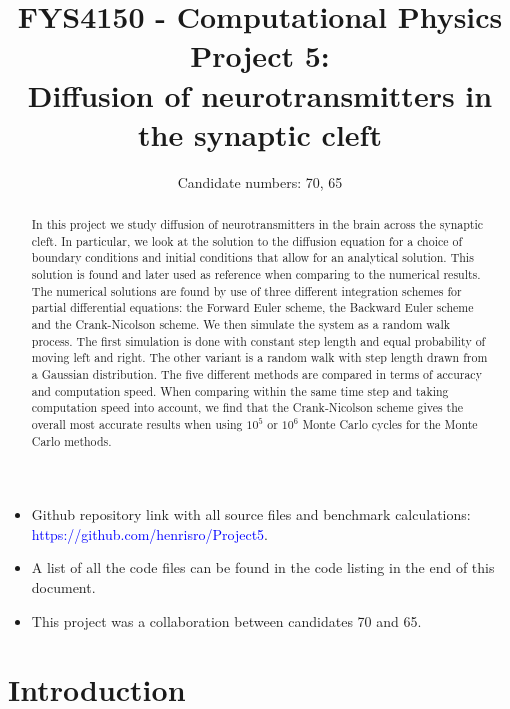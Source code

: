 \documentclass[a4paper, 11pt, notitlepage,english]{article}
\author{Candidate numbers: 70, 65}
\title{FYS4150 - Computational Physics \\
      Project 5: \\
       Diffusion of neurotransmitters in the synaptic cleft}
\begin{document}
\maketitle

\begin{abstract}
In this project we study diffusion of neurotransmitters in the brain across the synaptic cleft. In particular, we look at the solution to the diffusion equation for a choice of boundary conditions and initial conditions that allow for an analytical solution. This solution is found and later used as reference when comparing to the numerical results. The numerical solutions are found by use of three different integration schemes for partial differential equations: the Forward Euler scheme, the Backward Euler scheme and the Crank-Nicolson scheme. We then simulate the system as a random walk process. The first simulation is done with constant step length and equal probability of moving left and right. The other variant is a random walk with step length drawn from a Gaussian distribution. The five different methods are compared in terms of accuracy and computation speed. When comparing within the same time step and taking computation speed into account, we find that the Crank-Nicolson scheme gives the overall most accurate results when using $10^5$ or $10^6$ Monte Carlo cycles for the Monte Carlo methods. \\
\end{abstract}

\begin{itemize}
\item Github repository link with all source files and benchmark calculations: \\
 \textcolor{blue}{https://github.com/henrisro/Project5}.
\item A list of all the code files can be found in the code listing in the end of this document.
\item This project was a collaboration between candidates 70 and 65.
\end{itemize}

\section{Introduction}
\end{document}
